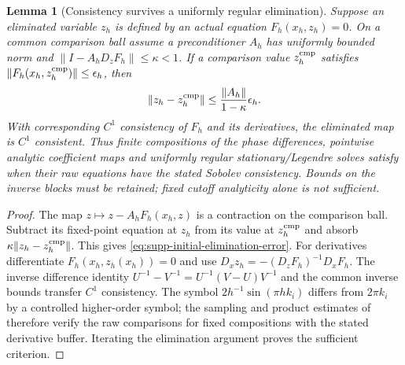\documentclass[11pt]{article}
\numberwithin{equation}{section}
\newtheorem{lemma}[lemma]{Lemma}
\theoremstyle{definition}
\theoremstyle{remark}
\begin{document}
\begin{lemma}[Consistency survives a uniformly regular elimination]
\label{lem:supp-initial-elimination-consistency}
Suppose an eliminated variable $z_h$ is defined by an actual equation
$F_h(x_h,z_h)=0$.  On a common comparison ball assume a preconditioner $A_h$
has uniformly bounded norm and
$\|I-A_hD_zF_h\|\le\kappa<1$.  If a comparison value $z_h^{\rm cmp}$
satisfies $\|F_h(x_h,z_h^{\rm cmp})\|\le\epsilon_h$, then
\begin{equation}
 \|z_h-z_h^{\rm cmp}\|
 \le\frac{\|A_h\|}{1-\kappa}\epsilon_h.
 \label{eq:supp-initial-elimination-error}
\end{equation}
With corresponding $C^1$ consistency of $F_h$ and its derivatives, the
eliminated map is $C^1$ consistent.  Thus finite compositions of the phase
differences, pointwise analytic coefficient maps and uniformly regular
stationary/Legendre solves satisfy
 when their raw equations have the stated
Sobolev consistency.  Bounds on the inverse blocks must be retained; fixed
cutoff analyticity alone is not sufficient.
\end{lemma}
\begin{proof}
The map $z\mapsto z-A_hF_h(x_h,z)$ is a contraction on the comparison ball.
Subtract its fixed-point equation at $z_h$ from its value at
$z_h^{\rm cmp}$ and absorb $\kappa\|z_h-z_h^{\rm cmp}\|$.  This gives
\eqref{eq:supp-initial-elimination-error}.  For derivatives differentiate
$F_h(x_h,z_h(x_h))=0$ and use
$D_xz_h=-(D_zF_h)^{-1}D_xF_h$.  The inverse difference identity
$U^{-1}-V^{-1}=U^{-1}(V-U)V^{-1}$ and the common inverse bounds transfer
$C^1$ consistency.  The symbol
$2h^{-1}\sin(\pi hk_i)$ differs from $2\pi k_i$ by a controlled
higher-order symbol; the sampling and product estimates of
 therefore verify the raw comparisons
for fixed compositions with the stated derivative buffer.  Iterating the
elimination argument proves the sufficient criterion.
\end{proof}
\end{document}
